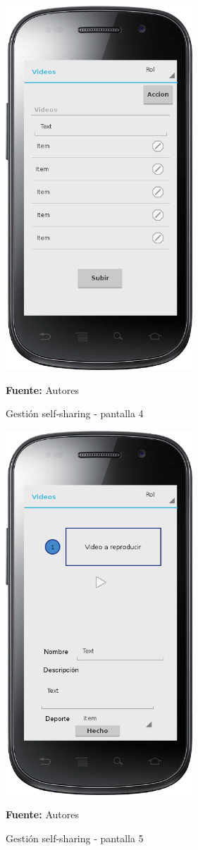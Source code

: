 \begin{figure}[!htb]
  \begin{center}
    \includegraphics[width=7cm]{./imagenes/UI/Self_sharing/self_sharing_4.png}
    \caption{Gestión self-sharing - pantalla 4}
    \label{fig:self_sharing_4}
    \textbf{Fuente:}  Autores
  \end{center}
\end{figure}

\begin{figure}[!htb]
  \begin{center}
    \includegraphics[width=7cm]{./imagenes/UI/Self_sharing/self_sharing_5.png}
    \caption{Gestión self-sharing - pantalla 5}
    \label{fig:self_sharing_5}
    \textbf{Fuente:}  Autores
  \end{center}
\end{figure}


